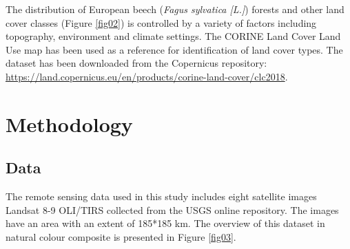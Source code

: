 \documentclass[remotesensing,article,submit,pdftex,moreauthors]{Definitions/mdpi}
\begin{document}
The distribution of European beech {(\emph{Fagus sylvatica [L.]})} forests and other{ }land cover classes (Figure \ref{fig02}) is controlled by a variety of factors including topography, environment and climate settings. The CORINE Land Cover Land Use map has been used as a reference for identification of land cover types. The dataset has been downloaded from the Copernicus repository: \href{https://land.copernicus.eu/en/products/corine-land-cover/clc2018}{https://land.copernicus.eu/en/products/corine-land-cover/clc2018}. 

\section{Methodology}\label{sec2}

\subsection{Data}
The remote sensing data used in this study includes eight satellite images Landsat 8-9 OLI/TIRS collected from the USGS online repository. The images have an area with an extent of 185*185 km. The overview of this dataset in natural colour composite is presented in Figure \ref{fig03}.
\end{document}

